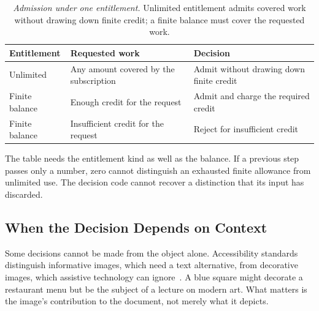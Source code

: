 {\footnotesize
\begin{longtable}[]{@{}
  >{\raggedright\arraybackslash}p{}
  >{\raggedright\arraybackslash}p{}
  >{\raggedright\arraybackslash}p{}@{}}
\caption[Admission under one entitlement]{\emph{Admission under one entitlement.} Unlimited entitlement admits covered work without drawing down finite credit; a finite balance must cover the requested work.}\label{simple-admission-policy}\tabularnewline
\toprule\noalign{}
\begin{minipage}[b]{\linewidth}\raggedright
Entitlement
\end{minipage} & \begin{minipage}[b]{\linewidth}\raggedright
Requested work
\end{minipage} & \begin{minipage}[b]{\linewidth}\raggedright
Decision
\end{minipage} \\
\midrule\noalign{}
\endhead
\bottomrule\noalign{}
\endlastfoot
Unlimited & Any amount covered by the subscription & Admit without drawing down finite credit \\
Finite balance & Enough credit for the request & Admit and charge the required credit \\
Finite balance & Insufficient credit for the request & Reject for insufficient credit \\
\end{longtable}
}

The table needs the entitlement kind as well as the balance. If a previous step passes only a number, zero cannot distinguish an exhausted finite allowance from unlimited use. The decision code cannot recover a distinction that its input has discarded.

\subsection{When the Decision Depends on Context}\label{heading:when-the-decision-depends-on-context}


Some decisions cannot be made from the object alone. Accessibility standards distinguish informative images, which need a text alternative, from decorative images, which assistive technology can ignore~\citep{w3c2018wcag21}. A blue square might decorate a restaurant menu but be the subject of a lecture on modern art. What matters is the image's contribution to the document, not merely what it depicts.

